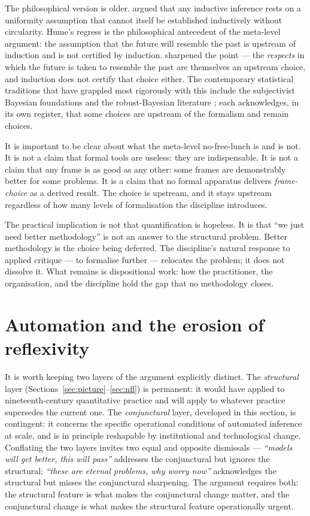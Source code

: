 \documentclass[11pt,a4paper]{article}
\begin{document}
The philosophical version is older. \citet{Hume1748} argued that any
inductive inference rests on a uniformity assumption that cannot itself
be established inductively without circularity. Hume's regress is the
philosophical antecedent of the meta-level argument: the assumption
that the future will resemble the past is upstream of induction and is
not certified by induction. \citet{Goodman1955} sharpened the point ---
the \emph{respects} in which the future is taken to resemble the past
are themselves an upstream choice, and induction does not certify that
choice either. The contemporary statistical traditions that have
grappled most rigorously with this include the subjectivist Bayesian
foundations \citep{deFinetti1974,Savage1954,Jaynes2003} and the
robust-Bayesian literature \citep{Berger1985,RiosInsuaRuggeri2000}; each
acknowledges, in its own register, that some choices are upstream of the
formalism and remain choices.

It is important to be clear about what the meta-level no-free-lunch is and
is not. It is not a claim that formal tools are useless: they are
indispensable. It is not a claim that any frame is as good as any other:
some frames are demonstrably better for some problems. It is a claim that
no formal apparatus delivers \emph{frame-choice} as a derived result. The
choice is upstream, and it stays upstream regardless of how many levels
of formalisation the discipline introduces.

The practical implication is not that quantification is hopeless. It is
that ``we just need better methodology'' is not an answer to the
structural problem. Better methodology is the choice being deferred. The
discipline's natural response to applied critique --- to formalise
further --- relocates the problem; it does not dissolve it. What remains
is dispositional work: how the practitioner, the organisation, and the
discipline hold the gap that no methodology closes.

\section{Automation and the erosion of reflexivity}
\label{sec:automation}

It is worth keeping two layers of the argument explicitly distinct. The
\emph{structural} layer (Sections~\ref{sec:picture}--\ref{sec:nfl}) is
permanent: it would have applied to nineteenth-century quantitative
practice and will apply to whatever practice supersedes the current one.
The
\emph{conjunctural} layer, developed in this section, is contingent: it
concerns the specific operational conditions of automated inference at
scale, and is in principle reshapable by institutional and technological
change. Conflating the two layers invites two equal and opposite
dismissals --- \emph{``models will get better, this will pass''} addresses
the conjunctural but ignores the structural; \emph{``these are eternal
problems, why worry now''} acknowledges the structural but misses the
conjunctural sharpening. The argument requires both: the structural
feature is what makes the conjunctural change matter, and the
conjunctural change is what makes the structural feature operationally
urgent.
\end{document}
